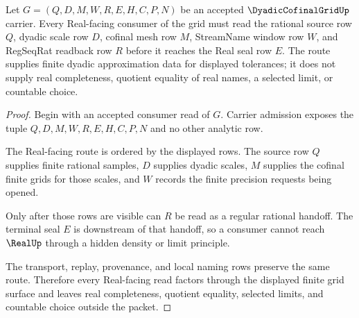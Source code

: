 \begin{theorem}
\label{thm:dyadic-cofinal-grid-real-readback-route}
Let $G=(Q,D,M,W,R,E,H,C,P,N)$ be an accepted $\DyadicCofinalGridUp$ carrier. Every Real-facing consumer of the grid must read the rational source row $Q$, dyadic scale row $D$, cofinal mesh row $M$, StreamName window row $W$, and RegSeqRat readback row $R$ before it reaches the Real seal row $E$. The route supplies finite dyadic approximation data for displayed tolerances; it does not supply real completeness, quotient equality of real names, a selected limit, or countable choice.
\end{theorem}
\begin{proof}
Begin with an accepted consumer read of $G$. Carrier admission exposes the tuple $Q,D,M,W,R,E,H,C,P,N$ and no other analytic row.

The Real-facing route is ordered by the displayed rows. The source row $Q$ supplies finite rational samples, $D$ supplies dyadic scales, $M$ supplies the cofinal finite grids for those scales, and $W$ records the finite precision requests being opened.

Only after those rows are visible can $R$ be read as a regular rational handoff. The terminal seal $E$ is downstream of that handoff, so a consumer cannot reach $\RealUp$ through a hidden density or limit principle.

The transport, replay, provenance, and local naming rows preserve the same route. Therefore every Real-facing read factors through the displayed finite grid surface and leaves real completeness, quotient equality, selected limits, and countable choice outside the packet.
\end{proof}



